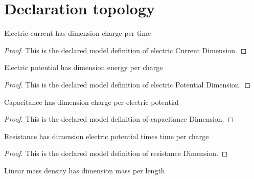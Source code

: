\section{Declaration topology}
\begin{definition}
  \label{def:physics:phyx-mini-0971:phyxminiproblems-problemphyxmini0971-electriccurrentdimension}
  Electric current has dimension charge per time
\end{definition}
\begin{proof}
  This is the declared model definition of electric Current Dimension.
\end{proof}
\begin{definition}
  \label{def:physics:phyx-mini-0971:phyxminiproblems-problemphyxmini0971-electricpotentialdimension}
  Electric potential has dimension energy per charge
\end{definition}
\begin{proof}
  This is the declared model definition of electric Potential Dimension.
\end{proof}
\begin{definition}
  \label{def:physics:phyx-mini-0971:phyxminiproblems-problemphyxmini0971-capacitancedimension}
  Capacitance has dimension charge per electric potential
\end{definition}
\begin{proof}
  This is the declared model definition of capacitance Dimension.
\end{proof}
\begin{definition}
  \label{def:physics:phyx-mini-0971:phyxminiproblems-problemphyxmini0971-resistancedimension}
  Resistance has dimension electric potential times time per charge
\end{definition}
\begin{proof}
  This is the declared model definition of resistance Dimension.
\end{proof}
\begin{definition}
  \label{def:physics:phyx-mini-0971:phyxminiproblems-problemphyxmini0971-linearmassdensitydimension}
  Linear mass density has dimension mass per length
\end{definition}

